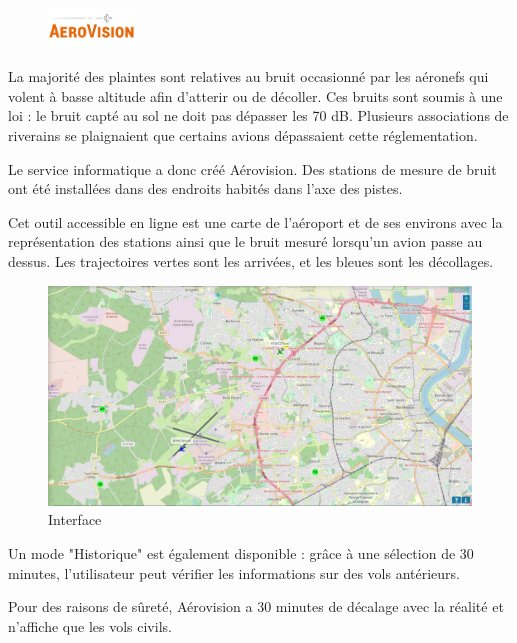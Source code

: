 \begin{figure}[hbt!]
  \centering
  \includegraphics[width=2.3cm]{Images/logo_aerovision.jpg}
  \label{fig:logoaerovision}
\end{figure}

La majorité des plaintes sont relatives au bruit occasionné par les aéronefs qui volent à basse altitude afin d'atterir ou de décoller.
Ces bruits sont soumis à une loi : le bruit capté au sol ne doit pas dépasser les 70 dB. Plusieurs associations de riverains se plaignaient que certains avions dépassaient cette réglementation.\newline

Le service informatique a donc créé Aérovision. Des stations de mesure de bruit ont été installées dans des endroits habités dans l'axe des pistes.

Cet outil accessible en ligne est une carte de l'aéroport et de ses environs avec la représentation des stations ainsi que le bruit mesuré lorsqu'un avion passe au dessus. Les trajectoires vertes sont les arrivées, et les bleues sont les décollages.

\begin{figure}[hbt!]
  \centering
  \includegraphics[width=15.4cm]{Images/aerovision.png}\newline
  \caption{Interface}
  \label{fig:interfaceaerovision}
\end{figure}

\newpage

Un mode "Historique" est également disponible : grâce à une sélection de 30 minutes, l'utilisateur peut vérifier les informations sur des vols antérieurs.

Pour des raisons de sûreté, Aérovision a 30 minutes de décalage avec la réalité et n'affiche que les vols civils.

